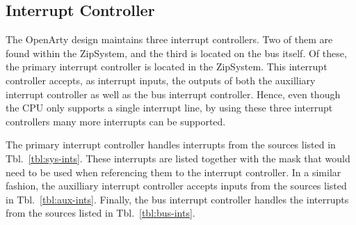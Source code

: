 \documentclass{gqtekspec}
\begin{document}
\subsection{Interrupt Controller}
The OpenArty design maintains three interrupt controllers.  Two of them
are found within the ZipSystem, and the third is located on the bus
itself.  Of these, the primary interrupt controller is located in the ZipSystem.
This interrupt controller accepts, as interrupt inputs, the outputs of both
the auxilliary interrupt controller as well as the bus interrupt controller.
Hence, even though the CPU only supports a single interrupt line, by using
these three interrupt controllers many more interrupts can be supported.

The primary interrupt controller handles interrupts from the sources listed
in Tbl.~\ref{tbl:sys-ints}.  These interrupts are listed together with the
mask that would need to be used when referencing them to the interrupt
controller.  In a similar fashion, the auxilliary interrupt controller accepts
inputs from the sources listed in Tbl.~\ref{tbl:aux-ints}.  Finally, the
bus interrupt controller handles the interrupts from the sources listed in
Tbl.~\ref{tbl:bus-ints}.
\end{document}
